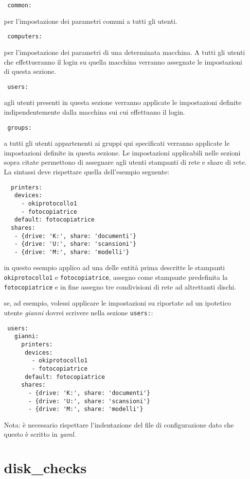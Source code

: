 \documentclass[a4paper,10pt,oneside]{memoir}
\begin{document}
\begin{verbatim}
 common:
\end{verbatim}
per l'impostazione dei parametri comuni a tutti gli utenti.
\begin{verbatim}
 computers:
\end{verbatim}
per l'impostazione dei parametri di una determinata macchina. A tutti gli utenti che effettueranno il login su quella macchina verranno assegnate le impostazioni di questa sezione.
\begin{verbatim}
 users:
\end{verbatim}
agli utenti presenti in questa sezione verranno applicate le impostazioni definite indipendentemente dalla macchina sui cui effettuano il login.
\begin{verbatim}
 groups:
\end{verbatim}
a tutti gli utenti appartenenti ai gruppi qui specificati verranno applicate le impostazioni definite in questa sezione. Le impostazioni applicabili nelle sezioni sopra citate permettono di assegnare agli utenti stampanti di rete e share di rete. La sintassi deve rispettare quella dell'esempio seguente:
\begin{verbatim}
  printers:
   devices:
     - okiprotocollo1
     - fotocopiatrice
   default: fotocopiatrice
  shares:
   - {drive: 'K:', share: 'documenti'}
   - {drive: 'U:', share: 'scansioni'}
   - {drive: 'M:', share: 'modelli'}
\end{verbatim}
  
in questo esempio applico ad una delle entità prima descritte le stampanti \verb#okiprotocollo1# e \verb#fotocopiatrice#, assegno come stampante predefinita la \verb#fotocopiatrice# e in fine assegno tre condivisioni di rete ad altrettanti dischi.

se, ad esempio, volessi applicare le impostazioni su riportate ad un ipotetico utente \emph{gianni} dovrei scrivere nella sezione \verb#users:#:
\begin{verbatim}
 users:
   gianni:
     printers:
      devices:
        - okiprotocollo1
        - fotocopiatrice
      default: fotocopiatrice
     shares:
       - {drive: 'K:', share: 'documenti'}
       - {drive: 'U:', share: 'scansioni'}
       - {drive: 'M:', share: 'modelli'}
\end{verbatim}
Nota: è necessario rispettare l'indentazione del file di configurazione dato che questo è scritto in \emph{yaml}.

\section*{disk\_checks}
\end{document}
